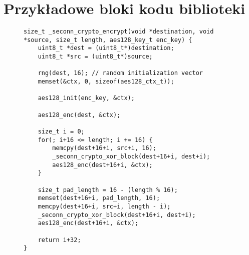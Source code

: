 \chapter{Przykładowe bloki kodu biblioteki}
\label{app:codesamples}




\begin{figure}[h]
\begin{lstlisting}[caption={Szyfrowanie CBC wraz z obsługą dopełnienia PKCS\#7},label={lst:encrypt}]
size_t _seconn_crypto_encrypt(void *destination, void *source, size_t length, aes128_key_t enc_key) {
    uint8_t *dest = (uint8_t*)destination;
    uint8_t *src = (uint8_t*)source;

    rng(dest, 16); // random initialization vector
    memset(&ctx, 0, sizeof(aes128_ctx_t));

    aes128_init(enc_key, &ctx);

    aes128_enc(dest, &ctx);

    size_t i = 0;
    for(; i+16 <= length; i += 16) {
        memcpy(dest+16+i, src+i, 16);
        _seconn_crypto_xor_block(dest+16+i, dest+i);
        aes128_enc(dest+16+i, &ctx);
    }

    size_t pad_length = 16 - (length % 16);
    memset(dest+16+i, pad_length, 16);
    memcpy(dest+16+i, src+i, length - i);
    _seconn_crypto_xor_block(dest+16+i, dest+i);
    aes128_enc(dest+16+i, &ctx);

    return i+32;
}
\end{lstlisting}
\end{figure}

